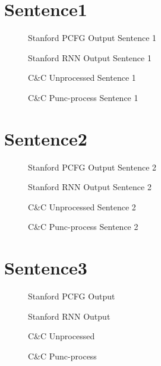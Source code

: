 \documentclass{article}
\begin{document}
\section{Sentence1}

\begin{figure}[h!]
\centering

\caption{Stanford PCFG Output Sentence 1}
\end{figure}
\begin{figure}[h!]
\centering

\caption{Stanford RNN Output Sentence 1}
\end{figure}
\begin{figure}[h!]
\centering

\caption{C\&C Unprocessed Sentence 1}
\end{figure}
\begin{figure}[h!]
\centering

\caption{C\&C Punc-process Sentence 1}
\end{figure}
\pagebreak

\section{Sentence2}
\begin{figure}[h!]
\centering

\caption{Stanford PCFG Output Sentence 2}
\end{figure}
\begin{figure}[h!]
\centering

\caption{Stanford RNN Output Sentence 2}
\end{figure}
\begin{figure}[h!]
\centering

\caption{C\&C Unprocessed Sentence 2}
\end{figure}
\begin{figure}[h!]
\centering

\caption{C\&C Punc-process Sentence 2}
\end{figure}
\pagebreak


\section{Sentence3}
\begin{figure}[h!]
\centering

\caption{Stanford PCFG Output}
\end{figure}
\begin{figure}[h!]
\centering

\caption{Stanford RNN Output}
\end{figure}
\begin{figure}[h!]
\centering

\caption{C\&C Unprocessed}
\end{figure}
\begin{figure}[h!]
\centering

\caption{C\&C Punc-process}
\end{figure}
\pagebreak
\end{document}
